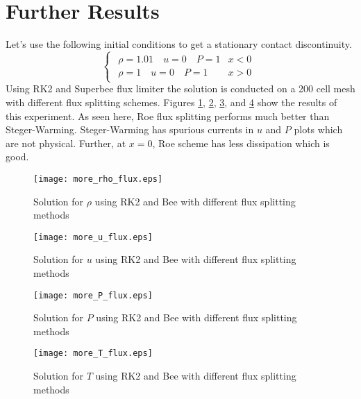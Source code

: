 \documentclass{article}
\begin{document}
\section{Further Results}
Let's use the following initial conditions to get a stationary contact discontinuity.
\begin{equation*}
\begin{cases}
\begin{matrix}
\rho=1.01 \quad u=0 \quad P=1 & x<0 \\
\rho=1 \quad u=0 \quad P=1 & x>0
\end{matrix}
\end{cases}
\end{equation*}
Using RK2 and Superbee flux limiter the solution is conducted on a 200 cell mesh with different flux splitting schemes. Figures \ref{fig_more_rho_flux}, \ref{fig_more_u_flux}, \ref{fig_more_P_flux}, and \ref{fig_more_T_flux} show the results of this experiment. As seen here, Roe flux splitting performs much better than Steger-Warming. Steger-Warming has spurious currents in $u$ and $P$ plots which are not physical. Further, at $x=0$, Roe scheme has less dissipation which is good.

\begin{figure}[H]
\centering
\texttt{[image: more\_rho\_flux.eps]}
\caption{Solution for $\rho$ using RK2 and Bee with different flux splitting methods}
\label{fig_more_rho_flux}
\end{figure}

\begin{figure}[H]
\centering
\texttt{[image: more\_u\_flux.eps]}
\caption{Solution for $u$ using RK2 and Bee with different flux splitting methods}
\label{fig_more_u_flux}
\end{figure}

\begin{figure}[H]
\centering
\texttt{[image: more\_P\_flux.eps]}
\caption{Solution for $P$ using RK2 and Bee with different flux splitting methods}
\label{fig_more_P_flux}
\end{figure}

\begin{figure}[H]
\centering
\texttt{[image: more\_T\_flux.eps]}
\caption{Solution for $T$ using RK2 and Bee with different flux splitting methods}
\label{fig_more_T_flux}
\end{figure}
\end{document}
